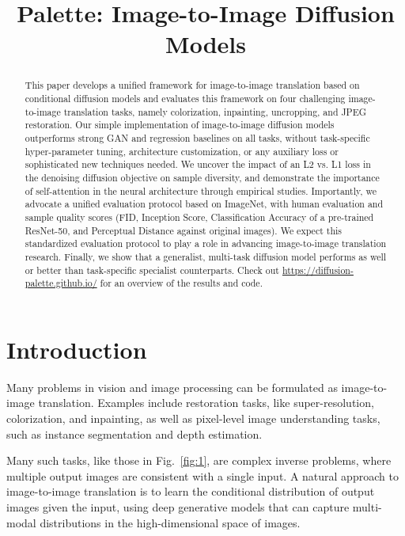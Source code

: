 \title{Palette: Image-to-Image Diffusion Models}

\begin{abstract}
This paper develops a unified framework for image-to-image translation based on conditional diffusion models and evaluates this framework on four challenging image-to-image translation tasks, namely colorization, inpainting, uncropping, and JPEG restoration. Our simple implementation of image-to-image diffusion models outperforms strong GAN and regression baselines on all tasks, without task-specific hyper-parameter tuning, architecture customization, or any auxiliary loss or sophisticated new techniques needed. We uncover the impact of an L2 vs. L1 loss in the denoising diffusion objective on sample diversity, and demonstrate the importance of self-attention in the neural architecture through empirical studies. Importantly, we advocate a unified evaluation protocol based on ImageNet, with human evaluation and sample quality scores (FID, Inception Score, Classification Accuracy of a pre-trained ResNet-50, and Perceptual Distance against original images). We expect this standardized evaluation protocol to play a role in advancing image-to-image translation research. Finally, we show that a generalist, multi-task diffusion model performs as well or better than task-specific specialist counterparts. Check out \href{https://diffusion-palette.github.io/}{https://diffusion-palette.github.io/} for an overview of the results and code.
\end{abstract}

\section{Introduction}
\label{sec:intro}

Many problems in vision and image processing can be formulated as image-to-image translation. Examples include restoration tasks, like super-resolution, colorization, and inpainting, as well as pixel-level image understanding tasks, such as instance segmentation and depth estimation.  

Many such tasks, like those in Fig.\ \ref{fig:1}, are complex inverse problems, where multiple output images are consistent with a single input. A natural approach to image-to-image translation is to learn the conditional distribution of output images given the input, using deep generative models that can capture multi-modal distributions in the high-dimensional space of images.

